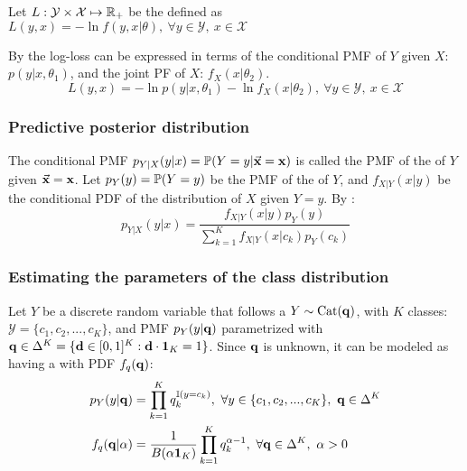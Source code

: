 \clearpage
Let $L:\mathcal{Y}\times\mathcal{X}\mapsto\operatorname{\mathbb{R}}_+$ be the  defined as $L(y,x) = -\ln f(y,x|\theta),\ \forall y\in\mathcal{Y},\ x\in\mathcal{X}$









By  the log-loss can be expressed in terms of the conditional PMF of $Y$ given $X$: $p(y|x,\theta_1)$, and the joint PF of $X$: $f_X(x|\theta_2)$.
\begin{equation*}
    L(y,x) = -\ln p(y|x,\theta_1)-\ln f_X(x|\theta_2),\ \forall y\in\mathcal{Y},\ x\in\mathcal{X}
\end{equation*}











\subsubsection{Predictive posterior distribution}

The conditional PMF $p_{Y|X}(y|x)=\operatorname{\mathbb{P}}(Y=y|\va{x}=\vb{x})$ is called the PMF of the  of $Y$ given $\va{x}=\vb{x}$. Let $p_Y(y)=\operatorname{\mathbb{P}}(Y=y)$ be the PMF of the  of $Y$, and $f_{X|Y}(x|y)$ be the conditional PDF of the distribution of $X$ given $Y=y$. By :
\begin{equation*}
    p_{Y|X}(y|x)= \frac{f_{X|Y}(x|y)p_Y(y)}{\sum_{k=1}^Kf_{X|Y}(x|c_k)p_Y(c_k)}
\end{equation*}

\subsubsection{Estimating the parameters of the class distribution}



Let $Y$ be a discrete random variable that follows a 
 $Y\sim\textrm{Cat}(\vb{q})$, with $K$ classes: $\mathcal{Y} =\{c_1,c_2,...,c_K\}$, and PMF $p_Y(y|\vb{q})$ parametrized with $\vb{q}\in \Delta^K = \{\vb{d}\in[0,1]^K: \vb{d}\cdot\vb{1}_K=1 \}$. Since $\vb{q}$ is unknown, it can be modeled as having a   with PDF $f_q(\vb{q})$: 
\begin{align*}
    p_Y(y|\vb{q}) & =\prod_{k=1}^Kq_{k}^{\operatorname{\mathbb{I}}(y=c_k)}, \ \forall y\in\{c_1,c_2,...,c_K\},\ \vb{q}\in \Delta^K \\
    f_q(\vb{q}|\alpha) &= \frac{1}{B(\alpha\vb{1}_K)}\prod_{k=1}^Kq_{k}^{\alpha-1},\ \forall \vb{q}\in \Delta^K,\ \alpha>0
\end{align*}

